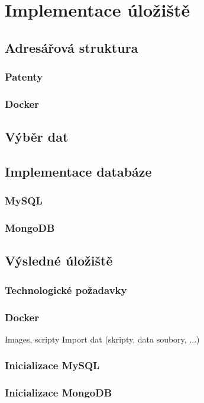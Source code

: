 \chapter{Implementace úložiště}

\section{Adresářová struktura}
\subsection{Patenty}
\subsection{Docker}

\section{Výběr dat}


\section{Implementace databáze}
\subsection{MySQL}
\subsection{MongoDB}

\section{Výsledné úložiště}
\subsection{Technologické požadavky}
\subsection{Docker}
Images, scripty \newline
Import dat (skripty, data soubory, ...) 
\subsection{Inicializace MySQL}
\subsection{Inicializace MongoDB}
